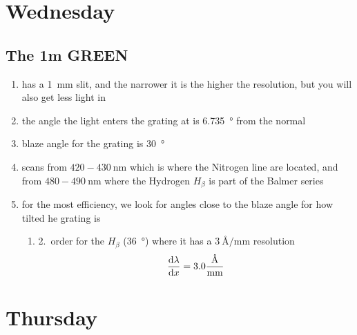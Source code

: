 \section{Wednesday}
\subsection{The 1m GREEN}
\begin{enumerate}[\(\bullet \)]
    \item has a \SI{1}{\milli\metre} slit, and the narrower it is the higher the resolution, but you will also get less light in
    \item the angle the light enters the grating at is \SI{6.735}{\degree} from the normal
    \item blaze angle for the grating is \SI{30}{\degree}
    \item scans from \(420-\SI{430}{\nano\metre}\) which is where the Nitrogen line are located, and from \(480-\SI{490}{\nano\metre}\) where the Hydrogen \(H_\beta \) is part of the Balmer series
    \item for the most efficiency, we look for angles close to the blaze angle for how tilted he grating is\begin{enumerate}[\(\triangleright \)]
        \item 2.\ order for the \(H_\beta \) (\SI{36}{\degree}) where it has a \(\SI{3}{\angstrom/\milli\metre}\) resolution\begin{equation*}
            \fracd[x]{\lambda}=3.0\frac{\si{\angstrom}}{\si{\milli\metre}}
        \end{equation*}
    \end{enumerate}
\end{enumerate}

\section{Thursday}

